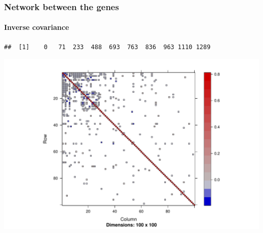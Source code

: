 \begin{frame}
\frametitle{Network between the genes}
\framesubtitle{Inverse covariance}

\begin{knitrout}\scriptsize
{}\color{fgcolor}\begin{kframe}
\begin{alltt}
\hlopt{$}
\end{alltt}
\begin{verbatim}
##  [1]    0   71  233  488  693  763  836  963 1110 1289
\end{verbatim}
\begin{alltt}
\hlstd{(}\hlopt{$}\hlstd{icov[[}\hlstd{]]))}
\end{alltt}
\end{kframe}
\includegraphics[width=.8\textwidth]{figures/r_show_plasmodium_glasso4-1} 

\end{knitrout}
\end{frame}


